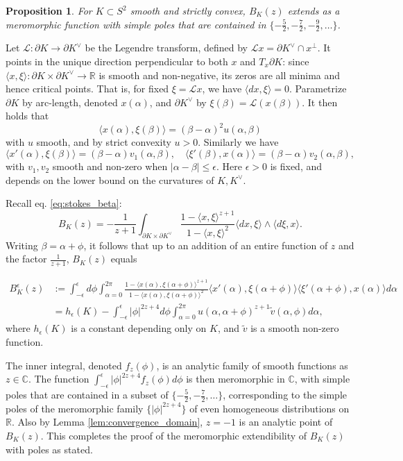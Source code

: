 \documentclass[reqno,10pt]{amsart}
\newcounter{mp}
\newtheorem{Proposition}{Proposition}[section]
\newcommand{\R}{\mathbb{R}}
\newcommand{\C}{\mathbb{C}}
\begin{document}
\begin{Proposition}
	For $K\subset S^2$ smooth and strictly convex, $B_K(z)$ extends as a meromorphic function with simple poles that are contained in $\{-\frac52, -\frac72,-\frac 92,\dots\}$. 
\end{Proposition}
\proof
Let $\mathcal L:\partial K\to \partial K^\vee$ be the Legendre transform, defined by  $\mathcal L x=\partial K^\vee\cap x^\perp$. It points in the unique direction perpendicular to both $x$ and $T_x\partial K$: since $\langle x,\xi\rangle:\partial K\times\partial K^\vee\to \R$ is smooth and non-negative, its zeros are all minima and hence critical points. That is, for fixed $\xi=\mathcal L x$, we have $\langle dx,\xi\rangle =0$. Parametrize $\partial K$ by arc-length, denoted $x(\alpha)$, and $\partial K^\vee$ by $\xi(\beta)=\mathcal L(x(\beta))$. It then holds that 
\[ \langle x(\alpha), \xi(\beta)\rangle =(\beta-\alpha)^2 u(\alpha,\beta)\]
with $u$ smooth, and by strict convexity $u>0$. Similarly we have $$\langle x'(\alpha),\xi(\beta)\rangle =(\beta-\alpha) v_1(\alpha,\beta),\quad \langle \xi'(\beta),x(\alpha)\rangle =(\beta-\alpha) v_2(\alpha,\beta),$$ with $v_1,v_2$ smooth and non-zero when  $|\alpha-\beta|\leq \epsilon$. Here $\epsilon>0$  is fixed, and depends on the lower bound on the curvatures of $K, K^\vee$. 

Recall eq. \eqref{eq:stokes_beta}: 
\[B_K(z) =-\frac{1}{z+1}\int_{\partial K\times \partial K^\vee} \frac{1-\langle x,\xi\rangle^{z+1}}{1-\langle x,\xi\rangle^2}\langle dx,\xi\rangle\wedge \langle d\xi,x\rangle .\]
Writing $\beta=\alpha+\phi$, it follows that up to an addition of an entire function of $z$ and the factor $\frac{1}{z+1}$, $B_K(z)$ equals

\begin{align*}B^\epsilon_K(z)&:=\int_{-\epsilon}^\epsilon d\phi\int_{\alpha=0}^{2\pi}\frac{1-\langle x(\alpha),\xi(\alpha+\phi)\rangle^{z+1}}{1-\langle x(\alpha),\xi(\alpha+\phi)\rangle^{2}} \langle x'(\alpha), \xi(\alpha+\phi)\rangle
	\langle \xi'(\alpha+\phi), x(\alpha)\rangle  d\alpha 
	\\ &=h_\epsilon(K)-\int_{-\epsilon}^\epsilon|\phi|^{2z+4} d\phi\int_{\alpha=0}^{2\pi}  u(\alpha,\alpha+\phi)^{z+1}\tilde v(\alpha,\phi)d\alpha ,
\end{align*}
where $h_\epsilon(K)$ is a constant depending only on $K$, and $ \tilde v$ is a smooth non-zero function.

The inner integral, denoted $f_z(\phi)$, is an analytic family of smooth functions as $z\in\mathbb C$. The function $\int_{-\epsilon}^\epsilon|\phi|^{2z+4} f_z(\phi)d\phi$ is then meromorphic in $\C$, with simple poles that are contained in a subset of $\{-\frac52,-\frac 72,\dots\}$, corresponding to the simple poles of the meromorphic family  $\{|\phi|^{2z+4}\}$ of even homogeneous distributions on $\R$. Also by Lemma \ref{lem:convergence_domain}, $z=-1$ is an analytic point of $B_K(z)$. This completes the proof of the meromorphic extendibility of $B_K(z)$ with poles as stated.
\endproof
\end{document}
